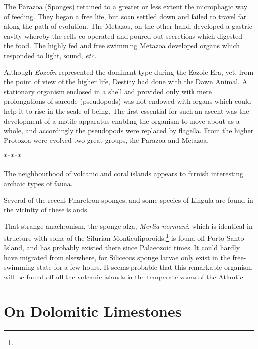 \documentclass[a4paper, 12pt, oneside]{article}
\begin{document}
The Parazoa (Sponges) retained to a greater or less extent the microphagic way of feeding. They began a free life, but soon settled down and failed to travel far along the path of evolution. The Metazoa, on the other hand, developed a gastric cavity whereby the cells co-operated and poured out secretions which digested the food. The highly fed and free swimming Metazoa developed organs which responded to light, sound, \emph{etc.}

Although \emph{Eozoön} represented the dominant type during the Eozoic Era, yet, from the point of view of the higher life, Destiny had done with the Dawn Animal. A stationary organism enclosed in a shell and provided only with mere prolongations of sarcode (pseudopods) was not endowed with organs which could help it to rise in the scale of being. The first essential for such an ascent was the development of a motile apparatus enabling the organism to move about as a whole, and accordingly the pseudopods were replaced by flagella. From the higher Protozoa were evolved two great groups, the Parazoa and Metazoa.

\centerline{*\hspace{15mm}*\hspace{15mm}*\hspace{15mm}*\hspace{15mm}*}
\bigskip

The neighbourhood of volcanic and coral islands appears to furnish interesting archaic types of fauna.

Several of the recent Pharetron sponges, and some species of Lingula are found in the vicinity of these islands.

That strange anachronism, the sponge-alga, \emph{Merlia normani}, which is identical in structure with some of the Silurian Monticuliporoids,\footnote{} is found off Porto Santo Island, and has probably existed there since Palaeozoic times. It could hardly have migrated from elsewhere, for Siliceous sponge larvae only exist in the free-swimming state for a few hours. It seems probable that this remarkable organism will be found off all the volcanic islands in the temperate zones of the Atlantic.
\clearpage
\section{On Dolomitic Limestones}
\end{document}
